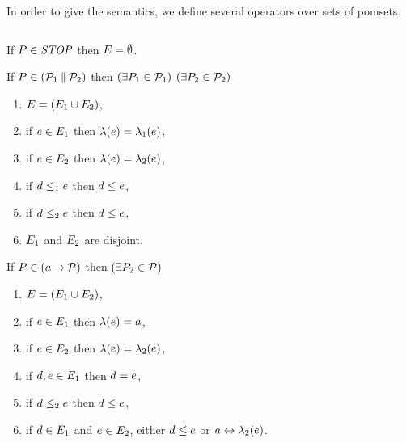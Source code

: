 In order to give the semantics, we define several operators over sets of
pomsets.

\begin{definition} $\phantom{\;}$\par
\label{tab:pomsets}

  \noindent
  If $\aPS\SB0\in\sSTOP$ then $\aEvs\SB0 = \emptyset$.

  \noindent
  If $\aPS\SB0 \in (\aPSS_1\sPAR\aPSS_2)$ then  
  $(\exists\aPS_1\in\aPSS_1)$ $(\exists\aPS_2\in\aPSS_2)$
  \begin{enumerate}
  \item $\aEvs\SB0 = (\aEvs_1\cup\aEvs_2)$,
  \item if $\aEv\in\aEvs_1$ then $\labeling\SB0(\aEv) = \labeling_1(\aEv)$, 
  \item if $\aEv\in\aEvs_2$ then $\labeling\SB0(\aEv) = \labeling_2(\aEv)$,
  \item if $\bEv\le_1\aEv$ then $\bEv\le\SB0\aEv$, 
  \item if $\bEv\le_2\aEv$ then $\bEv\le\SB0\aEv$, 
    \setcounter{pomsetParCount}{\value{enumi}}
  \item $\aEvs_1$ and $\aEvs_2$ are disjoint.
    \setcounter{pomsetParDisjointCount}{\value{enumi}}
  \end{enumerate}

  \noindent
  If $\aPS\SB0 \in (\aAct\sPREFIX\aPSS)$ then
  $(\exists\aPS_2\in\aPSS)$
  \begin{enumerate}
  \item $\aEvs\SB0=(\aEvs_1 \cup \aEvs_2)$,
  \item if $\aEv\in\aEvs_1$ then $\labelingAct\SB0(\aEv) = \aAct$,
  \item if $\aEv\in\aEvs_2$ then $\labelingAct\SB0(\aEv) = \labelingAct_2(\aEv)$,
  \item if $\bEv,\aEv\in\aEvs_1$ then $\bEv=\aEv$,
  \item if $\bEv\le_2\aEv$ then $\bEv\le\SB0\aEv$, 
  \item if $\bEv\in\aEvs_1$ and $\aEv\in\aEvs_2$, either $\bEv\leq\SB0\aEv$ or $a\reorder\labeling_2(\aEv)$.
    \setcounter{pomsetPrefixOrderCount}{\value{enumi}}
  \end{enumerate}
\end{definition}
